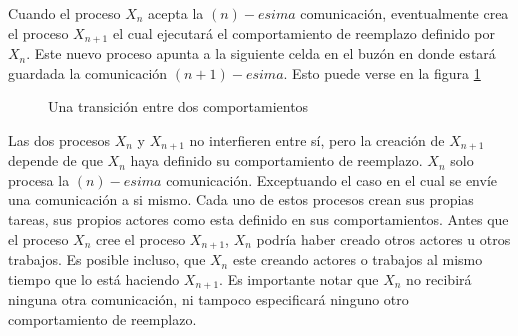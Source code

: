 Cuando el proceso $X_n$ acepta la $(n)-esima$ comunicación, eventualmente crea el proceso $X_{n+1}$ el cual ejecutará el comportamiento de reemplazo definido por $X_n$. Este nuevo proceso apunta a la siguiente celda en el buzón en donde estará guardada la comunicación $(n+1)-esima$. Esto puede verse en la figura \ref{fig:actortransition}

\begin{figure}[H]
\caption{Una transición entre dos comportamientos}
\label{fig:actortransition}
\end{figure}

Las dos procesos $X_n$ y $X_{n+1}$ no interfieren entre sí, pero la creación de $X_{n+1}$ depende de que $X_{n}$ haya definido su comportamiento de reemplazo. $X_n$ solo procesa la $(n)-esima$ comunicación. Exceptuando el caso en el cual se envíe una comunicación a si mismo. Cada uno de estos procesos crean sus propias tareas, sus propios actores como esta definido en sus comportamientos. Antes que el proceso $X_n$ cree el proceso $X_{n+1}$, $X_n$ podría haber creado otros actores u otros trabajos. Es posible incluso, que $X_n$ este creando actores o trabajos al mismo tiempo que lo está haciendo $X_{n+1}$. Es importante notar que $X_n$ no recibirá ninguna otra comunicación, ni tampoco especificará ninguno otro comportamiento de reemplazo.

